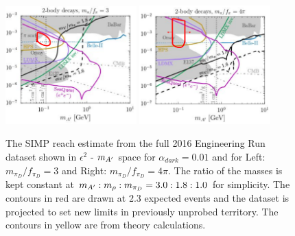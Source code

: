 \begin{figure}
    \centering
    \includegraphics[width=0.45\textwidth]{figs/upgrades/simpreach1.png}
    \includegraphics[width=0.45\textwidth]{figs/upgrades/simpreach2.png}
    \caption{The SIMP reach estimate from the full 2016 Engineering Run dataset shown in $\epsilon^2$ - $m_{A^\prime}$ space for $\alpha_{dark}=0.01$ and for Left: $m_{\pi_D}/f_{\pi_D}=3$ and Right: $m_{\pi_D}/f_{\pi_D}=4\pi$. The ratio of the masses is kept constant at $m_{A^\prime}:m_{\rho}:m_{\pi_D}=3.0:1.8:1.0$ for simplicity. The contours in red are drawn at 2.3 expected events and the dataset is projected to set new limits in previously unprobed territory. The contours in yellow are from theory calculations.}
    \label{fig:simpreach}
\end{figure}


